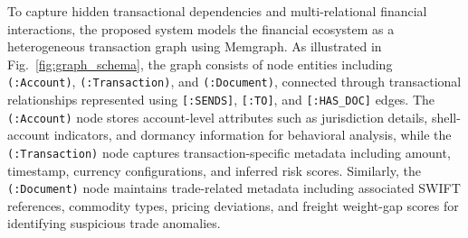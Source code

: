 \documentclass[conference]{IEEEtran}
\begin{document}
To capture hidden transactional dependencies and multi-relational financial interactions, the proposed system models the financial ecosystem as a heterogeneous transaction graph using Memgraph. As illustrated in Fig.~\ref{fig:graph_schema}, the graph consists of node entities including \texttt{(:Account)}, \texttt{(:Transaction)}, and \texttt{(:Document)}, connected through transactional relationships represented using \texttt{[:SENDS]}, \texttt{[:TO]}, and \texttt{[:HAS\_DOC]} edges. The \texttt{(:Account)} node stores account-level attributes such as jurisdiction details, shell-account indicators, and dormancy information for behavioral analysis, while the \texttt{(:Transaction)} node captures transaction-specific metadata including amount, timestamp, currency configurations, and inferred risk scores. Similarly, the \texttt{(:Document)} node maintains trade-related metadata including associated SWIFT references, commodity types, pricing deviations, and freight weight-gap scores for identifying suspicious trade anomalies.
\end{document}
